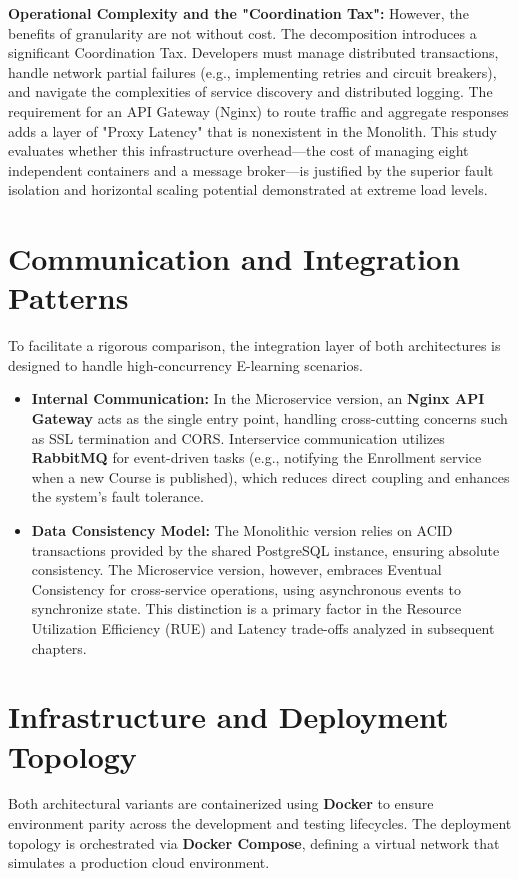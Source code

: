\textbf{Operational Complexity and the "Coordination Tax":}
However, the benefits of granularity are not without cost. The decomposition introduces a significant Coordination Tax. Developers must manage distributed transactions, handle network partial failures (e.g., implementing retries and circuit breakers), and navigate the complexities of service discovery and distributed logging. The requirement for an API Gateway (Nginx) to route traffic and aggregate responses adds a layer of "Proxy Latency" that is nonexistent in the Monolith. This study evaluates whether this infrastructure overhead—the cost of managing eight independent containers and a message broker—is justified by the superior fault isolation and horizontal scaling potential demonstrated at extreme load levels.

\section{Communication and Integration Patterns}

To facilitate a rigorous comparison, the integration layer of both architectures is designed to handle high-concurrency E-learning scenarios.

\begin{itemize}
\item \textbf{Internal Communication:} In the Microservice version, an \textbf{Nginx API Gateway} acts as the single entry point, handling cross-cutting concerns such as SSL termination and CORS. Interservice communication utilizes \textbf{RabbitMQ} for event-driven tasks (e.g., notifying the Enrollment service when a new Course is published), which reduces direct coupling and enhances the system's fault tolerance.
\item \textbf{Data Consistency Model:} The Monolithic version relies on ACID transactions provided by the shared PostgreSQL instance, ensuring absolute consistency. The Microservice version, however, embraces Eventual Consistency for cross-service operations, using asynchronous events to synchronize state. This distinction is a primary factor in the Resource Utilization Efficiency (RUE) and Latency trade-offs analyzed in subsequent chapters.
\end{itemize}

\section{Infrastructure and Deployment Topology}

Both architectural variants are containerized using \textbf{Docker} to ensure environment parity across the development and testing lifecycles. The deployment topology is orchestrated via \textbf{Docker Compose}, defining a virtual network that simulates a production cloud environment.
